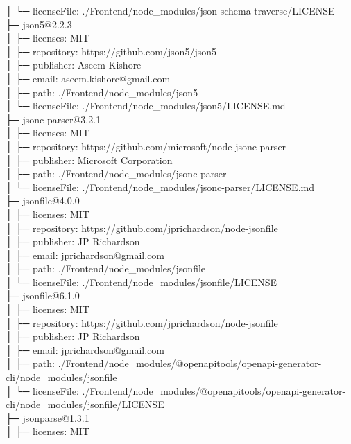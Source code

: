 \documentclass[
    paper=a4,
    twoside=false,
    parskip=half,
    listof=entryprefix,
    listof=totoc,
    index=totoc,
    bibliography=totoc,
    headsepline,
]{scrbook}
\begin{document}
    │  └─ licenseFile: ./Frontend/node\_modules/json-schema-traverse/LICENSE\\
    ├─ json5@2.2.3\\
    │  ├─ licenses: MIT\\
    │  ├─ repository: https://github.com/json5/json5\\
    │  ├─ publisher: Aseem Kishore\\
    │  ├─ email: aseem.kishore@gmail.com\\
    │  ├─ path: ./Frontend/node\_modules/json5\\
    │  └─ licenseFile: ./Frontend/node\_modules/json5/LICENSE.md\\
    ├─ jsonc-parser@3.2.1\\
    │  ├─ licenses: MIT\\
    │  ├─ repository: https://github.com/microsoft/node-jsonc-parser\\
    │  ├─ publisher: Microsoft Corporation\\
    │  ├─ path: ./Frontend/node\_modules/jsonc-parser\\
    │  └─ licenseFile: ./Frontend/node\_modules/jsonc-parser/LICENSE.md\\
    ├─ jsonfile@4.0.0\\
    │  ├─ licenses: MIT\\
    │  ├─ repository: https://github.com/jprichardson/node-jsonfile\\
    │  ├─ publisher: JP Richardson\\
    │  ├─ email: jprichardson@gmail.com\\
    │  ├─ path: ./Frontend/node\_modules/jsonfile\\
    │  └─ licenseFile: ./Frontend/node\_modules/jsonfile/LICENSE\\
    ├─ jsonfile@6.1.0\\
    │  ├─ licenses: MIT\\
    │  ├─ repository: https://github.com/jprichardson/node-jsonfile\\
    │  ├─ publisher: JP Richardson\\
    │  ├─ email: jprichardson@gmail.com\\
    │  ├─ path: ./Frontend/node\_modules/@openapitools/openapi-generator-cli/node\_modules/jsonfile\\
    │  └─ licenseFile: ./Frontend/node\_modules/@openapitools/openapi-generator-cli/node\_modules/jsonfile/LICENSE\\
    ├─ jsonparse@1.3.1\\
    │  ├─ licenses: MIT\\
\end{document}
